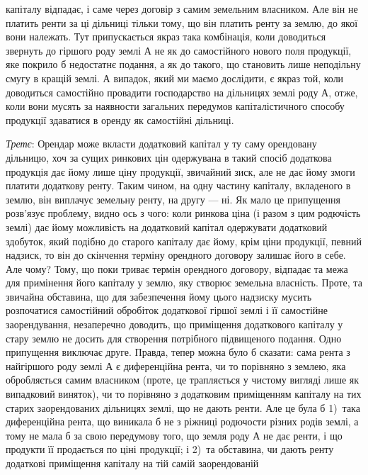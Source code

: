 \parcont{}  %
капіталу відпадає, і саме через договір з самим земельним власником. Але він не платить
ренти за ці дільниці тільки тому, що він платить ренту за землю, до
якої вони належать. Тут припускається якраз така комбінація, коли доводиться
звернуть до гіршого роду землі $А$ не як до самостійного нового поля продукції,
яке покрило б недостатнє подання, а як до такого, що становить лише
неподільну смугу в кращій землі. А випадок, який ми маємо дослідити, є якраз той,
коли доводиться самостійно провадити господарство на дільницях землі роду $А$,
отже, коли вони мусять за наявности загальних передумов капіталістичного способу
продукції здаватися в оренду як самостійні дільниці.

\emph{Третє}: Орендар може вкласти додатковий капітал у ту саму орендовану
дільницю, хоч за сущих ринкових цін одержувана в такий спосіб додаткова
продукція дає йому лише ціну продукції, звичайний зиск, але не дає йому
змоги платити додаткову ренту. Таким чином, на одну частину капіталу, вкладеного
в землю, він виплачує земельну ренту, на другу — ні. Як мало це припущення
розв’язує проблему, видно ось з чого: коли ринкова ціна (і разом
з цим родючість землі) дає йому можливість на додатковий капітал одержувати
додатковий здобуток, який подібно до старого капіталу дає йому, крім ціни продукції,
певний надзиск, то він до скінчення терміну орендного договору залишає
його в себе. Але чому? Тому, що поки триває термін орендного договору, відпадає
та межа для примінення його капіталу у землю, яку створює земельна
власність. Проте, та звичайна обставина, що для забезпечення йому цього надзиску
мусить розпочатися самостійний обробіток додаткової гіршої землі і її самостійне
заорендування, незаперечно доводить, що приміщення додаткового капіталу
у стару землю не досить для створення потрібного підвищеного подання.
Одно припущення виключає друге. Правда, тепер можна було б сказати: сама
рента з найгіршого роду землі $А$ є диференційна рента, чи то порівняно з землею,
яка обробляється самим власником (проте, це трапляється у чистому вигляді
лише як випадковий виняток), чи то порівняно з додатковим приміщенням
капіталу на тих старих заорендованих дільницях землі, що не дають ренти.
Але це була б 1)~така диференційна рента, що виникала б не з ріжниці родючости
різних родів землі, а тому не мала б за свою передумову того, що земля
роду $А$ не дає ренти, і що продукти її продається по ціні продукції; і 2)~та обставина,
чи дають ренту додаткові приміщення капіталу на тій самій заорендованій
